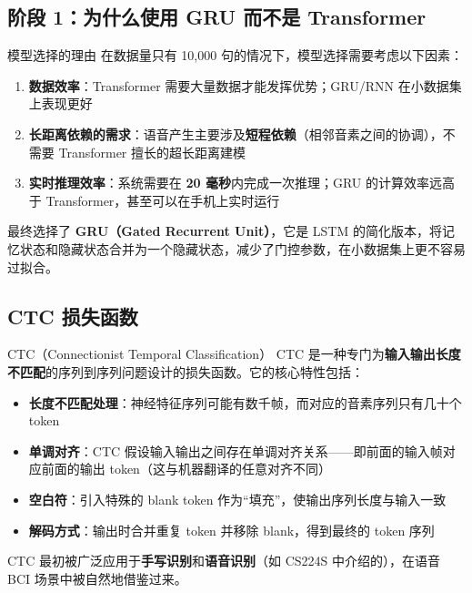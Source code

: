 \documentclass[a4paper]{article}
\begin{document}
\subsection{阶段 1：为什么使用 GRU 而不是 Transformer}

\begin{importantbox}{模型选择的理由}
在数据量只有 10,000 句的情况下，模型选择需要考虑以下因素：
\begin{enumerate}
    \item \textbf{数据效率}：Transformer 需要大量数据才能发挥优势；GRU/RNN 在小数据集上表现更好
    \item \textbf{长距离依赖的需求}：语音产生主要涉及\textbf{短程依赖}（相邻音素之间的协调），不需要 Transformer 擅长的超长距离建模
    \item \textbf{实时推理效率}：系统需要在 \textbf{20 毫秒}内完成一次推理；GRU 的计算效率远高于 Transformer，甚至可以在手机上实时运行
\end{enumerate}
\end{importantbox}

最终选择了 \textbf{GRU（Gated Recurrent Unit）}，它是 LSTM 的简化版本，将记忆状态和隐藏状态合并为一个隐藏状态，减少了门控参数，在小数据集上更不容易过拟合。

\subsection{CTC 损失函数}

\begin{knowledgebox}{CTC（Connectionist Temporal Classification）}
CTC 是一种专门为\textbf{输入输出长度不匹配}的序列到序列问题设计的损失函数。它的核心特性包括：

\begin{itemize}
    \item \textbf{长度不匹配处理}：神经特征序列可能有数千帧，而对应的音素序列只有几十个 token
    \item \textbf{单调对齐}：CTC 假设输入输出之间存在单调对齐关系——即前面的输入帧对应前面的输出 token（这与机器翻译的任意对齐不同）
    \item \textbf{空白符}：引入特殊的 blank token 作为``填充''，使输出序列长度与输入一致
    \item \textbf{解码方式}：输出时合并重复 token 并移除 blank，得到最终的 token 序列
\end{itemize}

CTC 最初被广泛应用于\textbf{手写识别}和\textbf{语音识别}（如 CS224S 中介绍的），在语音 BCI 场景中被自然地借鉴过来。
\end{knowledgebox}
\end{document}
